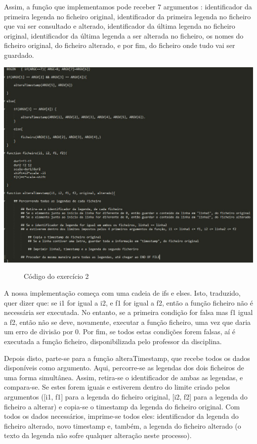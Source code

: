 \documentclass[a4paper]{article}
\begin{document}
Assim, a função que implementamos pode receber 7 argumentos : identificador da primeira legenda no ficheiro original, identificador da primeira legenda no ficheiro que vai ser consultado e alterado, identificador da última legenda no ficheiro original, identificador da última legenda a ser alterada no ficheiro, os nomes do ficheiro original, do ficheiro alterado, e por fim, do ficheiro onde tudo vai ser guardado.

\begin{center}
	\includegraphics[scale=0.45]{9}
	\begin{figure}[!h]
	\caption{Código do exercício 2}
	\end{figure}
\end{center}
\vspace{200px}
A nossa implementação começa com uma cadeia de ifs e elses. Isto, traduzido, quer dizer que: se i1 for igual a i2, e f1 for igual a f2, então a função ficheiro não é necessária ser executada. No entanto, se a primeira condição for falsa mas f1 igual a f2, então não se deve, novamente, executar a função ficheiro, uma vez que daria um erro de divisão por 0. Por fim, se todos estas condições forem falsas, aí é executada a função ficheiro, disponibilizada pelo professor da disciplina.

Depois disto, parte-se para a função alteraTimestamp, que recebe todos os dados disponíveis como argumento.
Aqui, percorre-se as legendas dos dois ficheiros de uma forma simultânea. Assim, retira-se o identificador de ambas as legendas, e compara-se. Se estes forem iguais e estiverem dentro do limite criado pelos argumentos ([i1, f1] para a legenda do ficheiro original, [i2, f2] para a legenda do ficheiro a alterar) e copia-se o timestamp da legenda do ficheiro original.
Com todos os dados necessários, imprime-se todos eles: identificador da legenda do ficheiro alterado, novo timestamp e, também, a legenda do ficheiro alterado (o texto da legenda não sofre qualquer alteração neste processo). 
\end{document}
